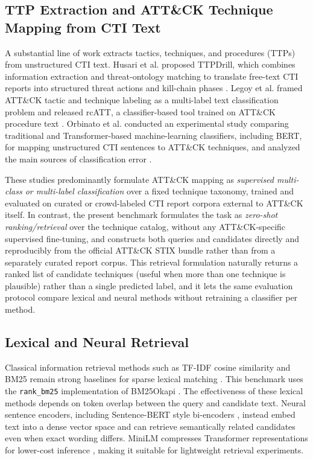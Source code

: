 \documentclass[conference]{IEEEtran}
\begin{document}
\subsection{TTP Extraction and ATT\&CK Technique Mapping from CTI Text}
A substantial line of work extracts tactics, techniques, and procedures (TTPs) from unstructured CTI text. Husari et al. proposed TTPDrill, which combines information extraction and threat-ontology matching to translate free-text CTI reports into structured threat actions and kill-chain phases \cite{husari2017ttpdrill}. Legoy et al. framed ATT\&CK tactic and technique labeling as a multi-label text classification problem and released rcATT, a classifier-based tool trained on ATT\&CK procedure text \cite{legoy2020automated}. Orbinato et al. conducted an experimental study comparing traditional and Transformer-based machine-learning classifiers, including BERT, for mapping unstructured CTI sentences to ATT\&CK techniques, and analyzed the main sources of classification error \cite{orbinato2022automatic}.

These studies predominantly formulate ATT\&CK mapping as \emph{supervised multi-class or multi-label classification} over a fixed technique taxonomy, trained and evaluated on curated or crowd-labeled CTI report corpora external to ATT\&CK itself. In contrast, the present benchmark formulates the task as \emph{zero-shot ranking/retrieval} over the technique catalog, without any ATT\&CK-specific supervised fine-tuning, and constructs both queries and candidates directly and reproducibly from the official ATT\&CK STIX bundle rather than from a separately curated report corpus. This retrieval formulation naturally returns a ranked list of candidate techniques (useful when more than one technique is plausible) rather than a single predicted label, and it lets the same evaluation protocol compare lexical and neural methods without retraining a classifier per method.

\subsection{Lexical and Neural Retrieval}
Classical information retrieval methods such as TF-IDF cosine similarity and BM25 remain strong baselines for sparse lexical matching \cite{manning2008introduction,robertson2009probabilistic}. This benchmark uses the \texttt{rank\_bm25} implementation of BM25Okapi \cite{rankbm25}. The effectiveness of these lexical methods depends on token overlap between the query and candidate text. Neural sentence encoders, including Sentence-BERT style bi-encoders \cite{reimers2019sentencebert}, instead embed text into a dense vector space and can retrieve semantically related candidates even when exact wording differs. MiniLM compresses Transformer representations for lower-cost inference \cite{wang2020minilm}, making it suitable for lightweight retrieval experiments.
\end{document}
